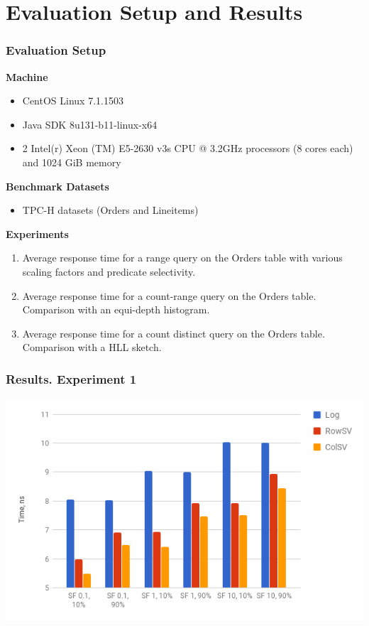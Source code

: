 \documentclass{beamer}
\begin{document}
\section{Evaluation Setup and Results}
\begin{frame}
\frametitle{Evaluation Setup} \pause
\textbf{Machine}
\begin{itemize}
\item{CentOS Linux 7.1.1503}
\item{Java SDK 8u131-b11-linux-x64}
\item{2 Intel(r) Xeon (TM) E5-2630 v3s CPU @ 3.2GHz processors (8 cores each) and 1024 GiB memory}
\end{itemize}
\pause
\textbf{Benchmark Datasets}
\begin{itemize}
\item{TPC-H datasets (Orders and Lineitems)}
\end{itemize}
\pause
\textbf{Experiments}
\begin{enumerate}
\item{Average response time for a range query on the Orders table with various scaling factors and predicate selectivity.}
\item{Average response time for a count-range query on the Orders table. Comparison with an equi-depth histogram.}
\item{Average response time for a count distinct query on the Orders table. Comparison with a HLL sketch.}
\end{enumerate}
\end{frame}

\begin{frame}
\frametitle{Results. Experiment 1}
\centering
\includegraphics[scale=0.5]{img/exp1.png}
\end{frame}
\end{document}
